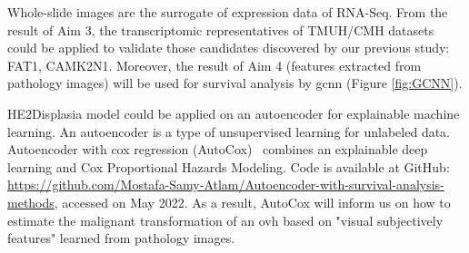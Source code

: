 \documentclass[12pt, a4paper]{article}
\begin{document}


Whole-slide images are the surrogate of expression data of RNA-Seq.
From the result of Aim 3, the transcriptomic representatives of TMUH/CMH datasets
could be applied to validate those candidates discovered by our previous study: FAT1, CAMK2N1.
Moreover, the result of Aim 4 (features extracted from pathology images) will be used for survival analysis 
by \acrshort{gcnn} (Figure \ref{fig:GCNN}). %





HE2Displasia model could be applied on an autoencoder for explainable machine learning.
An autoencoder is a type of unsupervised learning for unlabeled data.
Autoencoder with cox regression (AutoCox)~\citep{Torkey2021} combines an explainable deep learning and Cox Proportional Hazards Modeling. Code is available at GitHub: \url{https://github.com/Mostafa-Samy-Atlam/Autoencoder-with-survival-analysis-methods}, accessed on May 2022.
As a result, AutoCox will inform us on how to estimate the malignant transformation of an \acrlong{ovh} based on "visual subjectively features" learned from pathology images.

\end{document}
